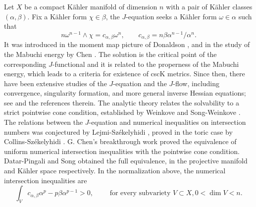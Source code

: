 \documentclass[reqno]{amsart}
\theoremstyle{remark}
\newcommand{\cab}{c_{\alpha,\beta}}
\theoremstyle{plain}
\begin{document}
Let $X$ be a compact K\"ahler manifold of dimension $n$ with a pair of K\"ahler classes $(\alpha,\beta)$. Fix a K\"ahler form $\chi\in \beta$, the $J$-equation seeks a K\"ahler form $\omega\in \alpha$ such that \[
n\omega^{n-1}\wedge \chi=\cab\omega^n, \qquad \cab=n\beta\alpha^{n-1}/\alpha^n.
\]
It was introduced in the moment map picture of Donaldson \cite{D99}, and in the study of the Mabuchi energy by Chen \cite{C00}. The solution is the critical point of the corresponding $J$-functional and it is related to the properness of the Mabuchi energy, which leads to a criteria for existence of cscK metrics. Since then, there have been extensive studies of the $J$-equation and the $J$-flow, including convergence, singularity formation, and more general inverse Hessian equations; see \cite{C04,W04,W06,SW08,FLM11,FL12,FL13,SW13,FLSW14,LS15,CS17,S18,SD20,S20,C21,DP21,T23,FM24,GS24,KSD24,KSD26,M26a,M26b} and the references therein. The analytic theory relates the solvability to a strict pointwise cone condition, established by Weinkove \cite{W04,W06} and Song-Weinkove \cite{SW08}. The relations between the $J$-equation and numerical inequalities on intersection numbers was conjectured by Lejmi-Sz\'ekelyhidi \cite{LS15}, proved in the toric case by Collins-Sz\'ekelyhidi \cite{CS17}. G. Chen's breakthrough work \cite{C21} proved the equivalence of uniform numerical intersection inequalities with the pointwise cone condition. Datar-Pingali \cite{DP21} and Song \cite{S20} obtained the full equivalence, in the projective manifold and K\"ahler space respectively. In the normalization above, the numerical intersection inequalities are \[
\int_V\cab\alpha^{p}-p\beta\alpha^{p-1}>0, \qquad \text{ for every subvariety }V\subset X, 0<\dim V<n. 
\]
\end{document}
